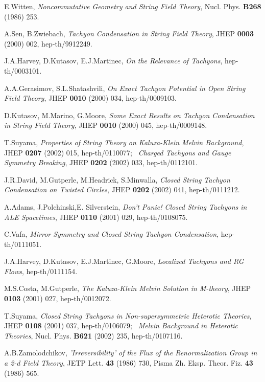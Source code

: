 \documentclass[a4paper,a4paper]{article}
\begin{document}
\begin{thebibliography}{99}

E.Witten, 
{\it Noncommutative Geometry and String Field Theory}, 
Nucl. Phys. {\bf B268} (1986) 253. 

A.Sen, B.Zwiebach, 
{\it Tachyon Condensation in String Field Theory}, 
JHEP {\bf 0003} (2000) 002, hep-th/9912249. 

J.A.Harvey, D.Kutasov, E.J.Martinec, 
{\it On the Relevance of Tachyons}, 
hep-th/0003101. 

A.A.Gerasimov, S.L.Shatashvili, 
{\it On Exact Tachyon Potential in Open String Field Theory}, 
JHEP {\bf 0010} (2000) 034, hep-th/0009103. 

D.Kutasov, M.Marino, G.Moore, 
{\it Some Exact Results on Tachyon Condensation in String Field Theory}, 
JHEP {\bf 0010} (2000) 045, hep-th/0009148. 

T.Suyama, 
{\it Properties of String Theory on Kaluza-Klein Melvin Background}, 
JHEP {\bf 0207} (2002) 015, hep-th/0110077; \ 
{\it Charged Tachyons and Gauge Symmetry Breaking}, 
JHEP {\bf 0202} (2002) 033, hep-th/0112101. 

J.R.David, M.Gutperle, M.Headrick, S.Minwalla, 
{\it Closed String Tachyon Condensation on Twisted Circles}, 
JHEP {\bf 0202} (2002) 041, hep-th/0111212. 

A.Adams, J.Polchinski,E. Silverstein, 
{\it Don't Panic! Closed String Tachyons in ALE Spacetimes}, 
JHEP {\bf 0110} (2001) 029, hep-th/0108075. 

C.Vafa, 
{\it Mirror Symmetry and Closed String Tachyon Condensation}, 
hep-th/0111051. 

J.A.Harvey, D.Kutasov, E.J.Martinec, G.Moore, 
{\it Localized Tachyons and RG Flows}, 
hep-th/0111154. 

M.S.Costa, M.Gutperle, 
{\it The Kaluza-Klein Melvin Solution in M-theory}, 
JHEP {\bf 0103} (2001) 027, hep-th/0012072.  

T.Suyama, 
{\it Closed String Tachyons in Non-supersymmetric Heterotic Theories}, 
JHEP {\bf 0108} (2001) 037, hep-th/0106079; \ 
{\it Melvin Background in Heterotic Theories}, 
Nucl. Phys. {\bf B621} (2002) 235, hep-th/0107116. 

A.B.Zamolodchikov, 
{\it 'Irreversibility' of the Flux of the Renormalization Group in a 2-d Field Theory}, 
JETP Lett. {\bf 43} (1986) 730, Pisma Zh. Eksp. Theor. Fiz. {\bf 43} (1986) 565. 


\end{thebibliography}
\end{document}
